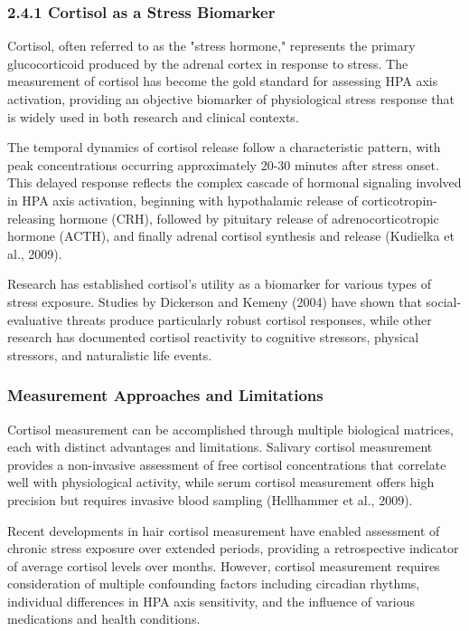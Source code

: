 \documentclass[11pt,a4paper]{article}
\begin{document}
\subsubsection{2.4.1 Cortisol as a Stress Biomarker}

Cortisol, often referred to as the "stress hormone," represents the primary glucocorticoid produced by the adrenal
cortex in response to stress. The measurement of cortisol has become the gold standard for assessing HPA axis
activation, providing an objective biomarker of physiological stress response that is widely used in both research and
clinical contexts.

The temporal dynamics of cortisol release follow a characteristic pattern, with peak concentrations occurring
approximately 20-30 minutes after stress onset. This delayed response reflects the complex cascade of hormonal signaling
involved in HPA axis activation, beginning with hypothalamic release of corticotropin-releasing hormone (CRH), followed
by pituitary release of adrenocorticotropic hormone (ACTH), and finally adrenal cortisol synthesis and release (Kudielka
et al., 2009).

Research has established cortisol's utility as a biomarker for various types of stress exposure. Studies by Dickerson
and Kemeny (2004) have shown that social-evaluative threats produce particularly robust cortisol responses, while other
research has documented cortisol reactivity to cognitive stressors, physical stressors, and naturalistic life events.

\subsubsection{Measurement Approaches and Limitations}

Cortisol measurement can be accomplished through multiple biological matrices, each with distinct advantages and
limitations. Salivary cortisol measurement provides a non-invasive assessment of free cortisol concentrations that
correlate well with physiological activity, while serum cortisol measurement offers high precision but requires invasive
blood sampling (Hellhammer et al., 2009).

Recent developments in hair cortisol measurement have enabled assessment of chronic stress exposure over extended
periods, providing a retrospective indicator of average cortisol levels over months. However, cortisol measurement
requires consideration of multiple confounding factors including circadian rhythms, individual differences in HPA axis
sensitivity, and the influence of various medications and health conditions.
\end{document}
